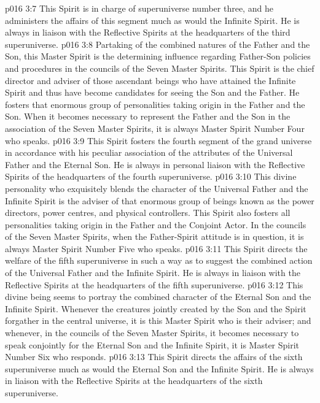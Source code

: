 \vs p016 3:7 This Spirit is in charge of superuniverse number three, and he administers the affairs of this segment much as would the Infinite Spirit. He is always in liaison with the Reflective Spirits at the headquarters of the third superuniverse.
\vs p016 3:8 \pc {} Partaking of the combined natures of the Father and the Son, this Master Spirit is the determining influence regarding Father\hyp{}Son policies and procedures in the councils of the Seven Master Spirits. This Spirit is the chief director and adviser of those ascendant beings who have attained the Infinite Spirit and thus have become candidates for seeing the Son and the Father. He fosters that enormous group of personalities taking origin in the Father and the Son. When it becomes necessary to represent the Father and the Son in the association of the Seven Master Spirits, it is always Master Spirit Number Four who speaks.
\vs p016 3:9 This Spirit fosters the fourth segment of the grand universe in accordance with his peculiar association of the attributes of the Universal Father and the Eternal Son. He is always in personal liaison with the Reflective Spirits of the headquarters of the fourth superuniverse.
\vs p016 3:10 \pc {} This divine personality who exquisitely blends the character of the Universal Father and the Infinite Spirit is the adviser of that enormous group of beings known as the power directors, power centres, and physical controllers. This Spirit also fosters all personalities taking origin in the Father and the Conjoint Actor. In the councils of the Seven Master Spirits, when the Father\hyp{}Spirit attitude is in question, it is always Master Spirit Number Five who speaks.
\vs p016 3:11 This Spirit directs the welfare of the fifth superuniverse in such a way as to suggest the combined action of the Universal Father and the Infinite Spirit. He is always in liaison with the Reflective Spirits at the headquarters of the fifth superuniverse.
\vs p016 3:12 \pc {} This divine being seems to portray the combined character of the Eternal Son and the Infinite Spirit. Whenever the creatures jointly created by the Son and the Spirit forgather in the central universe, it is this Master Spirit who is their adviser; and whenever, in the councils of the Seven Master Spirits, it becomes necessary to speak conjointly for the Eternal Son and the Infinite Spirit, it is Master Spirit Number Six who responds.
\vs p016 3:13 This Spirit directs the affairs of the sixth superuniverse much as would the Eternal Son and the Infinite Spirit. He is always in liaison with the Reflective Spirits at the headquarters of the sixth superuniverse.
